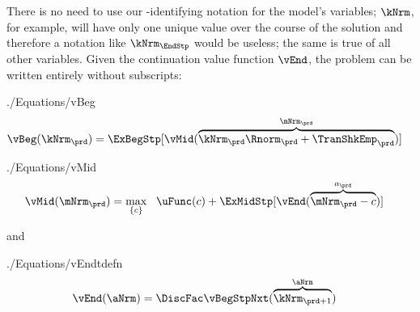 \documentclass[SolvingMicroDSOPs]{subfiles}
\begin{document}
There is no need to use our {\move}-identifying notation for the model's variables; $\kNrm$, for example, will have only one unique value over the course of the solution and therefore a notation like $\kNrm_{\EndStp}$ would be useless; the same is true of all other variables.  Given the continuation value function $\vEnd$, the problem can be written entirely without {\interval} subscripts:
\begin{verbatimwrite}{./Equations/vBeg}
  \begin{equation}\begin{gathered}\begin{aligned}
        \vBeg(\kNrm_{\prd}) & = \ExBegStp[\vMid(\overbrace{\kNrm_{\prd} \Rnorm_{\prd} + \TranShkEmp_{\prd}}^{\mNrm_{\prd}})]  \label{eq:vBeg}
      \end{aligned}\end{gathered}\end{equation}
\end{verbatimwrite}
\unskip
\begin{verbatimwrite}{./Equations/vMid}
  \begin{equation}\begin{gathered}\begin{aligned}
        \vMid(\mNrm_{\prd}) & = \max_{\{{c}\}}~~\uFunc({c}) +\ExMidStp[ \vEnd(\overbrace{\mNrm_{\prd}-{c}}^{a_{\prd}})] \label{eq:vMid}
      \end{aligned}\end{gathered}\end{equation}
\end{verbatimwrite}
\unskip
and
\begin{verbatimwrite}{./Equations/vEndtdefn}
  \begin{equation}\begin{gathered}\begin{aligned}
        \vEnd(\aNrm) & = \DiscFac \vBegStpNxt(\overbrace{\kNrm_{\prd+1}}^{\aNrm}) \label{eq:vEndtdefn}
      \end{aligned}\end{gathered}\end{equation}
\end{verbatimwrite}
\unskip
\end{document}
